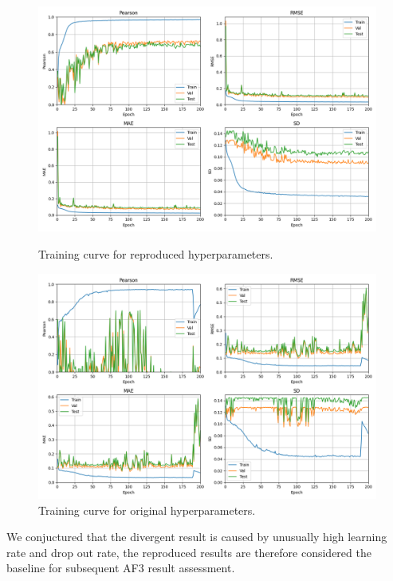 \documentclass[unnumsec,webpdf,contemporary,large]{oup-authoring-template}
\theoremstyle{thmstyleone}%
\theoremstyle{thmstyletwo}%
\theoremstyle{thmstylethree}%
\begin{document}
\begin{figure}[H]
    \centering
    \begin{minipage}{0.45\textwidth}
        \centering
        \includegraphics[width=\textwidth]{images/normal_converge.png}
        \caption{Training curve for reproduced hyperparameters.}
        \label{fig:ReproducedPlot}
    \end{minipage}\hfill
    \begin{minipage}{0.45\textwidth}
        \centering
        \includegraphics[width=\textwidth]{images/origin_param.png}
        \caption{Training curve for original hyperparameters.}
        \label{fig:OriginalPlot}
    \end{minipage}
\end{figure}

We conjuctured that the divergent result is caused by unusually high learning rate and drop out rate,
the reproduced results are therefore considered the baseline for subsequent AF3 result assessment.
\end{document}
